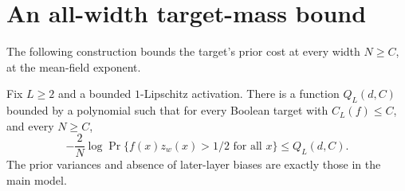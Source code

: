 \section{An all-width target-mass bound}\label{app:cloning}
The following construction bounds the target's prior cost at every width $N\geq C$,
at the mean-field exponent.

\begin{proposition}
Fix $L\geq2$ and a bounded $1$-Lipschitz activation. There is a function $Q_L(d,C)$ bounded by a polynomial such that for every Boolean target with
$C_L(f)\leq C$, and every $N\geq C$,
\[
 -\frac{2}{N}\log\Pr\{f(x)z_w(x)>1/2\text{ for all }x\}
 \leq Q_L(d,C).
\]
The prior variances and absence of later-layer biases are exactly those in the
main model.
\end{proposition}
